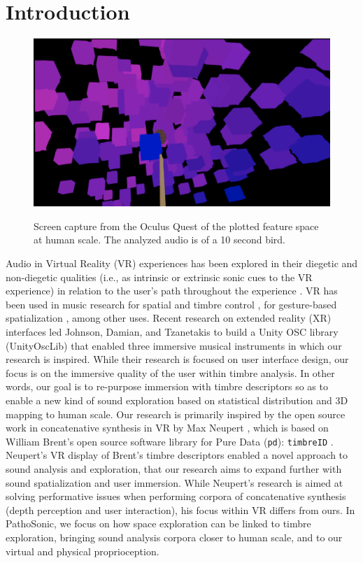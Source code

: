 \documentclass{nime-alternate}
\begin{document}
\section{Introduction}


\begin{figure}[htbp]
       \centering
              \includegraphics[width=1\textwidth]{pathosonic8.jpg}
       \label{Screen capture from the Oculus Quest of the plotted feature space at human scale. The analyzed audio is of a 10 second bird.}
       \caption{Screen capture from the Oculus Quest of the plotted feature space at human scale. The analyzed audio is of a 10 second bird.}
\end{figure}

Audio in Virtual Reality (VR) experiences has been explored in their diegetic and non-diegetic qualities (i.e., as intrinsic or extrinsic sonic cues to the VR experience) in relation to the user's path throughout the experience \cite{anil_camci_2019_3249315}. VR has been used in music research for spatial and timbre control \cite{rgraham2017}, for gesture-based spatialization \cite{giovanni_santini_2019_3249329}, among other uses. Recent research on extended reality (XR) interfaces led Johnson, Damian, and Tzanetakis \cite{david_johnson_2019_3249319} to build a Unity OSC library (UnityOscLib) that enabled three immersive musical instruments in which our research is inspired. While their research is focused on user interface design, our focus is on the immersive quality of the user within timbre analysis. In other words, our goal is to re-purpose immersion with timbre descriptors so as to enable a new kind of sound exploration based on statistical distribution and 3D mapping to human scale. Our research is primarily inspired by the open source work in concatenative synthesis in VR by Max Neupert \cite{neupert2017}, which is based on William Brent's open source software library for Pure Data (\texttt{pd}): \texttt{timbreID} \cite{icmc/bbp2372.2010.044}. Neupert's VR display of Brent’s timbre descriptors enabled a novel approach to sound analysis and exploration, that our research aims to expand further with sound spatialization and user immersion. While Neupert's research is aimed at solving performative issues when performing corpora of concatenative synthesis (depth perception and user interaction), his focus within VR differs from ours. In PathoSonic, we focus on how space exploration can be linked to timbre exploration, bringing sound analysis corpora closer to human scale, and to our virtual and physical proprioception. 
\end{document}
